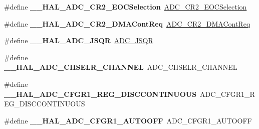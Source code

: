 \begin{DoxyCompactItemize}
\item 
\#define {\bfseries \+\_\+\+\_\+\+H\+A\+L\+\_\+\+A\+D\+C\+\_\+\+C\+R2\+\_\+\+E\+O\+C\+Selection}~\hyperlink{group___a_d_c___private___macros_gaa6514c197b4d16b3d08938cdad573ef5}{A\+D\+C\+\_\+\+C\+R2\+\_\+\+E\+O\+C\+Selection}\hypertarget{group___h_a_l___a_d_c___aliased___macros_gafb4baec5d5d5ebf891a3cd8a9a0bfe65}{}\label{group___h_a_l___a_d_c___aliased___macros_gafb4baec5d5d5ebf891a3cd8a9a0bfe65}

\item 
\#define {\bfseries \+\_\+\+\_\+\+H\+A\+L\+\_\+\+A\+D\+C\+\_\+\+C\+R2\+\_\+\+D\+M\+A\+Cont\+Req}~\hyperlink{group___a_d_c___private___macros_ga93bf2d0e4b9f98b83ee48be918e9c940}{A\+D\+C\+\_\+\+C\+R2\+\_\+\+D\+M\+A\+Cont\+Req}\hypertarget{group___h_a_l___a_d_c___aliased___macros_gaedcab24fbd762b1f6b65c7381f910308}{}\label{group___h_a_l___a_d_c___aliased___macros_gaedcab24fbd762b1f6b65c7381f910308}

\item 
\#define {\bfseries \+\_\+\+\_\+\+H\+A\+L\+\_\+\+A\+D\+C\+\_\+\+J\+S\+QR}~\hyperlink{group___a_d_c_ex___private___macros_gaa40c3e803cf20a8aebc3735a714606ad}{A\+D\+C\+\_\+\+J\+S\+QR}\hypertarget{group___h_a_l___a_d_c___aliased___macros_ga920c922d2385fcaab11b2ca7c8630da8}{}\label{group___h_a_l___a_d_c___aliased___macros_ga920c922d2385fcaab11b2ca7c8630da8}

\item 
\#define {\bfseries \+\_\+\+\_\+\+H\+A\+L\+\_\+\+A\+D\+C\+\_\+\+C\+H\+S\+E\+L\+R\+\_\+\+C\+H\+A\+N\+N\+EL}~A\+D\+C\+\_\+\+C\+H\+S\+E\+L\+R\+\_\+\+C\+H\+A\+N\+N\+EL\hypertarget{group___h_a_l___a_d_c___aliased___macros_gae5547f083abe059cacdcaac3e5066ea2}{}\label{group___h_a_l___a_d_c___aliased___macros_gae5547f083abe059cacdcaac3e5066ea2}

\item 
\#define {\bfseries \+\_\+\+\_\+\+H\+A\+L\+\_\+\+A\+D\+C\+\_\+\+C\+F\+G\+R1\+\_\+\+R\+E\+G\+\_\+\+D\+I\+S\+C\+C\+O\+N\+T\+I\+N\+U\+O\+US}~A\+D\+C\+\_\+\+C\+F\+G\+R1\+\_\+\+R\+E\+G\+\_\+\+D\+I\+S\+C\+C\+O\+N\+T\+I\+N\+U\+O\+US\hypertarget{group___h_a_l___a_d_c___aliased___macros_ga3703e313dbcb2af3dea5a07d622e67c6}{}\label{group___h_a_l___a_d_c___aliased___macros_ga3703e313dbcb2af3dea5a07d622e67c6}

\item 
\#define {\bfseries \+\_\+\+\_\+\+H\+A\+L\+\_\+\+A\+D\+C\+\_\+\+C\+F\+G\+R1\+\_\+\+A\+U\+T\+O\+O\+FF}~A\+D\+C\+\_\+\+C\+F\+G\+R1\+\_\+\+A\+U\+T\+O\+O\+FF\hypertarget{group___h_a_l___a_d_c___aliased___macros_gab767937348c3e3b3c22e7316e42004c1}{}\label{group___h_a_l___a_d_c___aliased___macros_gab767937348c3e3b3c22e7316e42004c1}


\end{DoxyCompactItemize}
